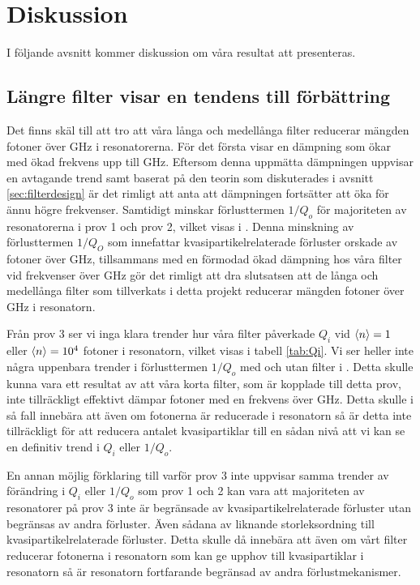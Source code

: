 \documentclass[main.tex]{subfiles}
\begin{document}
\chapter{Diskussion}
\label{ch:discussion} 

I följande avsnitt kommer diskussion om våra resultat att presenteras. 

\section{Längre filter visar en tendens till förbättring}


Det finns skäl till att tro att våra långa och medellånga filter reducerar mängden fotoner över \unit[88]{GHz} i resonatorerna. För det första visar  en dämpning som ökar med ökad frekvens upp till \unit[50]{GHz}. Eftersom denna uppmätta dämpningen uppvisar en avtagande trend samt baserat på den teorin som diskuterades i avsnitt \ref{sec:filterdesign} är det rimligt att anta att dämpningen fortsätter att öka för ännu högre frekvenser. Samtidigt minskar förlusttermen $1/Q_o$ för majoriteten av resonatorerna i prov 1 och prov 2, vilket visas i . Denna minskning av förlusttermen $1/Q_O$ som innefattar kvasipartikelrelaterade förluster orskade av fotoner över \unit[88]{GHz}, tillsammans med en förmodad ökad dämpning hos våra filter vid frekvenser över \unit[50]{GHz} gör det rimligt att dra slutsatsen att de långa och medellånga filter som tillverkats i detta projekt reducerar mängden fotoner över \unit[88]{GHz} i resonatorn.

Från prov 3 ser vi inga klara trender hur våra filter påverkade $Q_i$ vid $\expval{n}=1$ eller $\expval{n}=10^4$ fotoner i resonatorn, vilket visas i tabell \ref{tab:Qi}. Vi ser heller inte några uppenbara trender i förlusttermen $1/Q_o$ med och utan filter i . Detta skulle kunna vara ett resultat av att våra korta filter, som är kopplade till detta prov, inte tillräckligt effektivt dämpar fotoner med en frekvens över \unit[88]{GHz}. Detta skulle i så fall innebära att även om fotonerna är reducerade i resonatorn så är detta inte tillräckligt för att reducera antalet kvasipartiklar till en sådan nivå att vi kan se en definitiv trend i $Q_i$ eller $1/Q_o$.

En annan möjlig förklaring till varför prov 3 inte uppvisar samma trender av förändring i $Q_i$ eller $1/Q_o$ som prov 1 och 2 kan vara att majoriteten av resonatorer på prov 3 inte är begränsade av kvasipartikelrelaterade förluster utan begränsas av andra förluster. Även sådana av liknande storleksordning till kvasipartikelrelaterade förluster. Detta skulle då innebära att även om vårt filter reducerar fotonerna i resonatorn som kan ge upphov till kvasipartiklar i resonatorn så är resonatorn fortfarande begränsad av andra förlustmekanismer.
\end{document}
